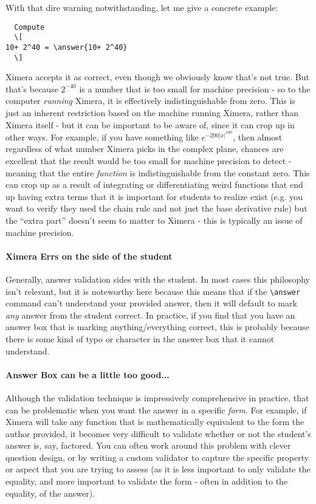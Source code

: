 \documentclass{ximera}
\begin{document}
With that dire warning notwithstanding, let me give a concrete example:
\begin{verbatim}
  Compute
  \[
10+ 2^40 = \answer{10+ 2^40}
  \]
\end{verbatim}

Ximera accepts it as correct, even though we obviously know that's not
true. But that's because $2^{-40}$ is a number that is too small for machine
precision - so to the computer \textit{running} Ximera, it is effectively
indistinguishable from zero. This is just an inherent restriction based on the
machine running Ximera, rather than Ximera itself - but it can be important to
be aware of, since it can crop up in other ways. For example, if you have
something like $e^{-200|x|^{100}}$, then almost regardless of what number
Ximera picks in the complex plane, chances are excellent that the result would
be too small for machine precision to detect - meaning that the entire
\textit{function} is indistinguishable from the constant zero. This can crop up
as a result of integrating or differentiating weird functions that end up
having extra terms that it is important for students to realize exist (e.g. you
want to verify they used the chain rule and not just the base derivative rule)
but the ``extra part'' doesn't seem to matter to Ximera - this is typically an
issue of machine precision.

\paragraph{Ximera Errs on the side of the student}

Generally, answer validation sides with the student. In most cases this
philosophy isn't relevant, but it is noteworthy here because this means that if
the \verb|\answer| command can't understand your provided answer, then it will
default to mark \textit{any} answer from the student correct. In practice, if
you find that you have an answer box that is marking anything/everything
correct, this is probably because there is some kind of typo or character in
the answer box that it cannot understand.

\paragraph{Answer Box can be a little too good...}

Although the validation technique is impressively comprehensive in
practice, that can be problematic when you want the answer in a specific
\textit{form}. For example, if Ximera will take any function that is
mathematically equivalent to the form the author provided, it becomes very
difficult to validate whether or not the student's answer is, say, factored.
You can often work around this problem with clever question design, or by
writing a custom validator to capture the specific property or aspect that you
are trying to assess (as it is less important to only validate the equality,
and more important to validate the form - often in addition to the equality, of
the answer).
\end{document}
